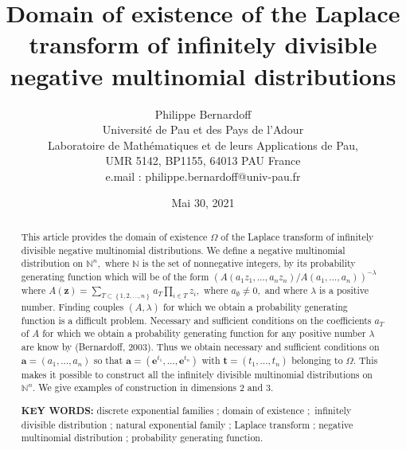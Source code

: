 \documentclass[a4paper,oneside,notitlepage]{article}%
\begin{document}
\title{Domain of existence of the Laplace transform of infinitely divisible negative
multinomial distributions}
\author{Philippe Bernardoff\\Universit\'{e} de Pau et des Pays de l'Adour\\Laboratoire de Math\'{e}matiques et de leurs Applications de Pau,\\UMR 5142, BP1155, 64013 PAU France\\e.mail : philippe.bernardoff@univ-pau.fr}
\date{Mai 30, 2021 }
\maketitle

\begin{abstract}
This article provides the domain of existence $\Omega$ of the Laplace
transform of infinitely divisible negative multinomial distributions. We
define a negative multinomial distribution on $\mathbb{N}^{n},$ where
$\mathbb{N}$ is the set of nonnegative integers, by its probability generating
function which will be of the form \newline$\left(  A\left(  a_{1}z_{1}%
,\ldots,a_{n}z_{n}\right)  /A\left(  a_{1},\ldots,a_{n}\right)  \right)
^{-\lambda}$ where $A\left(  \mathbf{z}\right)  =%
{\displaystyle\sum\limits_{T\subset\left\{  1,2,\ldots,n\right\}  }}
a_{T}\prod\limits_{i\in T}z_{i},$ where $a_{\emptyset}\neq0,$ and where
$\lambda$ is a positive number. Finding couples $\left(  A,\lambda\right)  $
for which we obtain a probability generating function is a difficult problem.
Necessary and sufficient conditions on the coefficients $a_{T}$ of $A$ for
which we obtain a probability generating function for any positive number
$\lambda$ are know by (Bernardoff, 2003). Thus we obtain necessary and
sufficient conditions on $\mathbf{a}=\left(  a_{1},\ldots,a_{n}\right)  $ so
that $\mathbf{a}=\left(  \mathbf{e}^{t_{1}},\ldots,\mathbf{e}^{t_{n}}\right)
$ with $\mathbf{t}=\left(  t_{1},\ldots,t_{n}\right)  $ belonging to $\Omega$.
This makes it possible to construct all the infinitely divisible multinomial
distributions on $\mathbb{N}^{n}$. We give examples of construction in
dimensions 2 and 3.

\textbf{KEY WORDS:} discrete exponential families ; domain of existence
;{\LARGE \ }infinitely divisible distribution ; natural exponential family ;
Laplace transform ; negative multinomial distribution ; probability generating function.

\newpage

\end{abstract}
\end{document}

